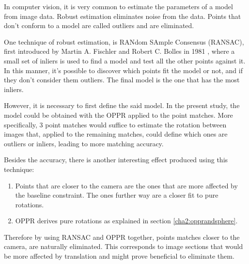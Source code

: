 In computer vision, it is very common to estimate the parameters of a model from image data. Robust estimation eliminates noise from the data. Points that don’t conform to a model are called outliers and are eliminated.

One technique of robust estimation, is RANdom SAmple Consensus (RANSAC), first introduced by Martin A. Fischler and Robert C. Bolles in 1981 \cite{ransac}, where a small set of inliers is used to find a model and test all the other points against it. In this manner, it's possible to discover which points fit the model or not, and if they don’t consider them outliers. The final model is the one that has the most inliers. 

However, it is necessary to first define the said model. In the present study, the model could be obtained with the OPPR applied to the point matches. More specifically, 3 point matches would suffice to estimate the rotation between images that, applied to the remaining matches, could define which ones are outliers or inliers, leading to more matching accuracy.

Besides the accuracy, there is another interesting effect produced using this technique:

\begin{enumerate}
\item Points that are closer to the camera are the ones that are more affected by the baseline constraint. The ones further way are a closer fit to pure rotations.

\item OPPR derives pure rotations as explained in section \ref{cha2:opprandsphere}. 
\end{enumerate}
Therefore by using RANSAC and OPPR together, points matches closer to the camera, are naturally eliminated. This corresponds to image sections that would be more affected by translation and might prove beneficial to eliminate them. \cite{mono} \\

